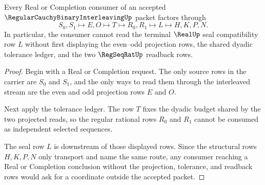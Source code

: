 \begin{theorem}
\label{thm:regular-cauchy-binary-interleaving-seal-stability}
Every Real or Completion consumer of an accepted $\RegularCauchyBinaryInterleavingUp$ packet factors through
$$
S_0,S_1 \longmapsto E,O \longmapsto T \longmapsto R_0,R_1 \longmapsto L \longmapsto H,K,P,N .
$$
In particular, the consumer cannot read the terminal $\RealUp$ seal compatibility row $L$ without first displaying the even--odd projection rows, the shared dyadic tolerance ledger, and the two $\RegSeqRatUp$ readback rows.
\end{theorem}
\begin{proof}
Begin with a Real or Completion request. The only source rows in the carrier are $S_0$ and $S_1$, and the only ways to read them through the interleaved stream are the even and odd projection rows $E$ and $O$.

Next apply the tolerance ledger. The row $T$ fixes the dyadic budget shared by the two projected reads, so the regular rational rows $R_0$ and $R_1$ cannot be consumed as independent selected sequences.

The seal row $L$ is downstream of those displayed rows. Since the structural rows $H,K,P,N$ only transport and name the same route, any consumer reaching a Real or Completion conclusion without the projection, tolerance, and readback rows would ask for a coordinate outside the accepted packet.
\end{proof}




